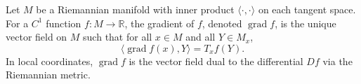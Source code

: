 Let $M$ be a Riemannian manifold with inner product $\langle \cdot, \cdot \rangle$ on each tangent space. For a $C^1$ function $f: M \to \mathbb{R}$, the gradient of $f$, denoted $\operatorname{grad} f$, is the unique vector field on $M$ such that for all $x \in M$ and all $Y \in M_x$,
$$\langle \operatorname{grad} f(x), Y \rangle = T_x f(Y).$$
In local coordinates, $\operatorname{grad} f$ is the vector field dual to the differential $Df$ via the Riemannian metric.
